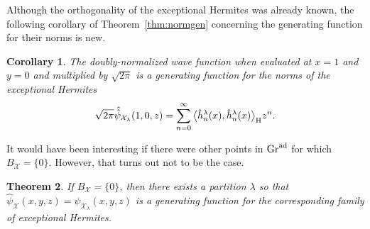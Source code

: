 \documentclass[pdftex]{sigma}
\numberwithin{equation}{section}
\newtheorem{Theorem}{Theorem}[section]
\newtheorem{Corollary}[Theorem]{Corollary}
\theoremstyle{definition}
\def\X{\mathcal{X}}
\begin{document}
Although the orthogonality of the exceptional Hermites was already known, the following
corollary of Theorem~\ref{thm:normgen} concerning the generating
function for their norms is new.
\begin{Corollary}
The doubly-normalized wave function when evaluated at $x=1$ and
$y=0$ and multiplied by $\sqrt{2\pi}$ is a generating function
for the norms of the exceptional Hermites
\[
\sqrt{2\pi}\hat{\hat\psi}_{\X_{\lambda}}(1,0,z)=\sum_{n=0}^{\infty}\big\langle \hat
h_n^{\lambda}(x),\hat h_n^{\lambda}(x)\big\rangle_{\rm H} z^n.
\]
\end{Corollary}

It would have been interesting if there were other points in ${\rm Gr}^{\rm ad}$
for which $B_{\X}=\{0\}$. However, that turns out not to be the case.

\begin{Theorem}\label{thm:onlyxh}
If $B_{\X}=\{0\}$, then there exists a partition $\lambda$ so that
$\hat\psi_{\X}(x,y,z)=\hat\psi_{\X_{\lambda}}(x,y,z)$ is a generating function
for the corresponding family of exceptional Hermites.
\end{Theorem}
\end{document}
